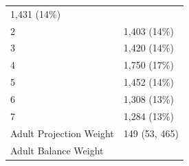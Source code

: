 \documentclass[]{article}
\begin{document}
\begin{longtable}[]{@{}ll@{}}
\begin{minipage}[t]{0.23\columnwidth}
1,431 (14\%)\strut
\end{minipage}\tabularnewline
\begin{minipage}[t]{0.71\columnwidth}\raggedright
2\strut
\end{minipage} & \begin{minipage}[t]{0.23\columnwidth}\raggedright
1,403 (14\%)\strut
\end{minipage}\tabularnewline
\begin{minipage}[t]{0.71\columnwidth}\raggedright
3\strut
\end{minipage} & \begin{minipage}[t]{0.23\columnwidth}\raggedright
1,420 (14\%)\strut
\end{minipage}\tabularnewline
\begin{minipage}[t]{0.71\columnwidth}\raggedright
4\strut
\end{minipage} & \begin{minipage}[t]{0.23\columnwidth}\raggedright
1,750 (17\%)\strut
\end{minipage}\tabularnewline
\begin{minipage}[t]{0.71\columnwidth}\raggedright
5\strut
\end{minipage} & \begin{minipage}[t]{0.23\columnwidth}\raggedright
1,452 (14\%)\strut
\end{minipage}\tabularnewline
\begin{minipage}[t]{0.71\columnwidth}\raggedright
6\strut
\end{minipage} & \begin{minipage}[t]{0.23\columnwidth}\raggedright
1,308 (13\%)\strut
\end{minipage}\tabularnewline
\begin{minipage}[t]{0.71\columnwidth}\raggedright
7\strut
\end{minipage} & \begin{minipage}[t]{0.23\columnwidth}\raggedright
1,284 (13\%)\strut
\end{minipage}\tabularnewline
\begin{minipage}[t]{0.71\columnwidth}\raggedright
Adult Projection Weight\strut
\end{minipage} & \begin{minipage}[t]{0.23\columnwidth}\raggedright
149 (53, 465)\strut
\end{minipage}\tabularnewline
\begin{minipage}[t]{0.71\columnwidth}\raggedright
Adult Balance Weight\strut
\end{minipage} & \begin{minipage}[t]{0.23\columnwidth}\raggedright

\end{minipage}
\end{longtable}
\end{document}
